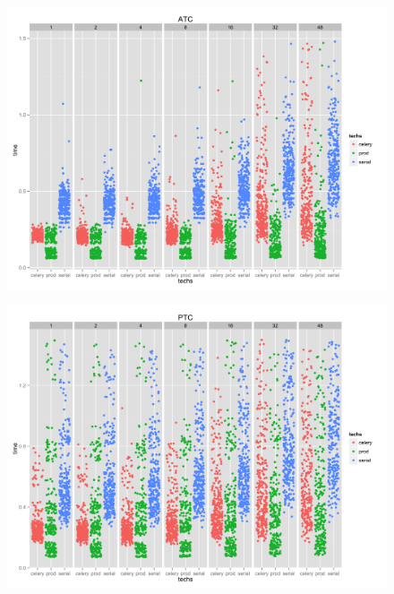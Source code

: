 \documentclass{beamer}
\begin{document}
\begin{frame}
\begin{figure}
\includegraphics[width=\linewidth]{images/ATC.png}
\end{figure}
\end{frame}

\begin{frame}
\begin{figure}
\includegraphics[width=\linewidth]{images/PTC.png}
\end{figure}
\end{frame}
\end{document}
